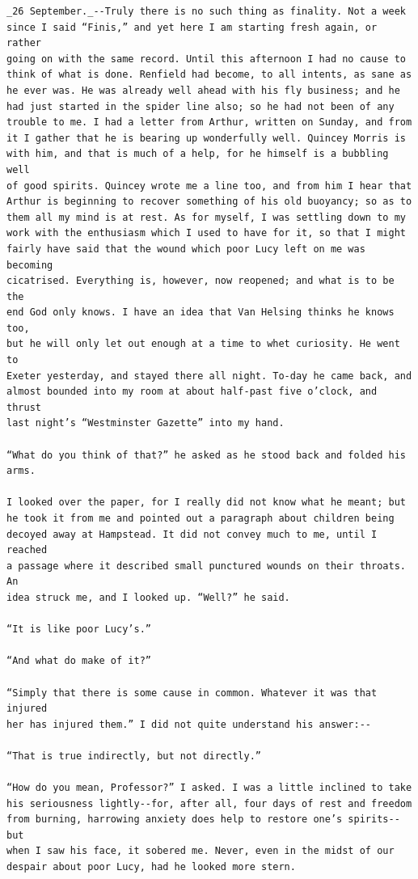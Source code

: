\documentclass{article}
\begin{document}
\begin{verbatim}
_26 September._--Truly there is no such thing as finality. Not a week
since I said “Finis,” and yet here I am starting fresh again, or rather
going on with the same record. Until this afternoon I had no cause to
think of what is done. Renfield had become, to all intents, as sane as
he ever was. He was already well ahead with his fly business; and he
had just started in the spider line also; so he had not been of any
trouble to me. I had a letter from Arthur, written on Sunday, and from
it I gather that he is bearing up wonderfully well. Quincey Morris is
with him, and that is much of a help, for he himself is a bubbling well
of good spirits. Quincey wrote me a line too, and from him I hear that
Arthur is beginning to recover something of his old buoyancy; so as to
them all my mind is at rest. As for myself, I was settling down to my
work with the enthusiasm which I used to have for it, so that I might
fairly have said that the wound which poor Lucy left on me was becoming
cicatrised. Everything is, however, now reopened; and what is to be the
end God only knows. I have an idea that Van Helsing thinks he knows too,
but he will only let out enough at a time to whet curiosity. He went to
Exeter yesterday, and stayed there all night. To-day he came back, and
almost bounded into my room at about half-past five o’clock, and thrust
last night’s “Westminster Gazette” into my hand.

“What do you think of that?” he asked as he stood back and folded his
arms.

I looked over the paper, for I really did not know what he meant; but
he took it from me and pointed out a paragraph about children being
decoyed away at Hampstead. It did not convey much to me, until I reached
a passage where it described small punctured wounds on their throats. An
idea struck me, and I looked up. “Well?” he said.

“It is like poor Lucy’s.”

“And what do make of it?”

“Simply that there is some cause in common. Whatever it was that injured
her has injured them.” I did not quite understand his answer:--

“That is true indirectly, but not directly.”

“How do you mean, Professor?” I asked. I was a little inclined to take
his seriousness lightly--for, after all, four days of rest and freedom
from burning, harrowing anxiety does help to restore one’s spirits--but
when I saw his face, it sobered me. Never, even in the midst of our
despair about poor Lucy, had he looked more stern.


\end{verbatim}
\end{document}
